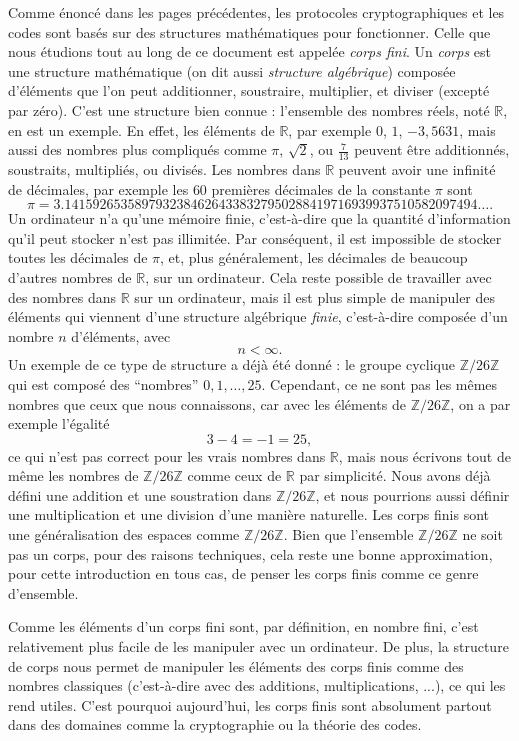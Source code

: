 Comme énoncé dans les pages précédentes, les protocoles cryptographiques et les
codes sont basés sur des structures mathématiques pour fonctionner. Celle que
nous étudions tout au long de ce document est appelée \emph{corps fini}. Un
\emph{corps} est une structure mathématique (on dit aussi \emph{structure
algébrique}) composée d'éléments que l'on peut additionner, soustraire,
multiplier, et diviser (excepté par zéro). C'est une structure bien connue :
l'ensemble des nombres réels, noté $\mathbb{R}$, en est un exemple. En effet,
les éléments de $\mathbb{R}$, par exemple $0$, $1$, $-3,5631$, mais aussi des
nombres plus compliqués comme $\pi$, $\sqrt2$, ou $\frac{7}{13}$ peuvent être
additionnés, soustraits, multipliés, ou divisés. Les nombres dans $\mathbb{R}$
peuvent avoir une infinité de décimales, par exemple les $60$ premières
décimales de la constante $\pi$ sont
\[
  \pi = 3.14159265358979323846264338327950288419716939937510582097494\dots.
\]
Un ordinateur n'a qu'une mémoire finie, c'est-à-dire que la quantité
d'information qu'il peut stocker n'est pas illimitée. Par conséquent, il est
impossible de stocker toutes les décimales de $\pi$, et, plus généralement, les
décimales de beaucoup d'autres nombres de $\mathbb{R}$, sur un ordinateur. Cela
reste possible de travailler avec des nombres dans $\mathbb{R}$ sur un
ordinateur, mais il est plus simple de manipuler des éléments
qui viennent d'une structure algébrique \emph{finie}, c'est-à-dire composée d'un
nombre $n$ d'éléments, avec 
\[
  n < \infty.
\]
Un exemple de ce type de structure a déjà été donné : le groupe cyclique
$\mathbb{Z}/26\mathbb{Z}$ qui est composé des ``nombres'' $0, 1, \dots, 25$.
Cependant, ce ne sont pas les mêmes nombres que ceux que nous connaissons, car
avec les éléments de $\mathbb{Z}/26\mathbb{Z}$, on a par exemple l'égalité
\[
  3-4 = -1 = 25,
\]
ce qui n'est pas correct pour les vrais nombres dans $\mathbb{R}$, mais nous
écrivons tout de même les nombres de $\mathbb{Z}/26\mathbb{Z}$ comme ceux de
$\mathbb{R}$ par simplicité. Nous avons déjà défini une addition et une
soustration dans $\mathbb{Z}/26\mathbb{Z}$, et nous pourrions aussi définir une
multiplication et une division d'une manière naturelle. Les corps finis sont une
généralisation des espaces comme $\mathbb{Z}/26\mathbb{Z}$. Bien que l'ensemble
$\mathbb{Z}/26\mathbb{Z}$ ne soit pas un corps, pour des raisons techniques,
cela reste une bonne approximation, pour cette introduction en tous cas, de
penser les corps finis comme ce genre d'ensemble.

Comme les éléments d'un corps fini sont, par définition, en nombre fini, c'est
relativement plus facile de les manipuler avec un ordinateur. De plus, la
structure de corps nous permet de manipuler les éléments des corps finis comme
des nombres classiques (c'est-à-dire avec des additions, multiplications, ...),
ce qui les rend utiles. C'est pourquoi aujourd'hui, les corps finis sont
absolument partout dans des domaines comme la cryptographie ou la théorie des
codes.

